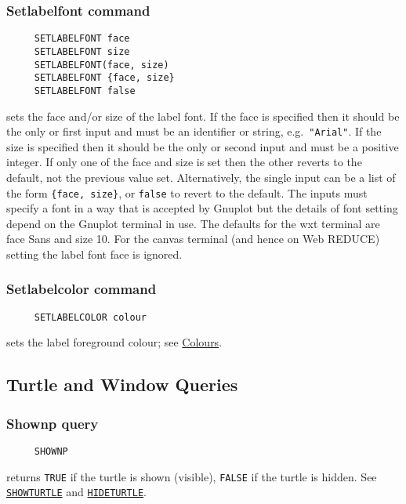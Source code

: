 \hypertarget{logoturtle:setlabelfont}{\subsubsection*{Setlabelfont command}}
\begin{verbatim}
     SETLABELFONT face
     SETLABELFONT size
     SETLABELFONT(face, size)
     SETLABELFONT {face, size}
     SETLABELFONT false
\end{verbatim}
sets the face and/or size of the label font.  If the face is specified
then it should be the only or first input and must be an identifier or
string, e.g.\ \texttt{"Arial"}.  If the size is specified then it
should be the only or second input and must be a positive integer.  If
only one of the face and size is set then the other reverts to the
default, not the previous value set.  Alternatively, the single input
can be a list of the form \texttt{\{face, size\}}, or \texttt{false}
to revert to the default.  The inputs must specify a font in a way
that is accepted by Gnuplot but the details of font setting depend on
the Gnuplot terminal in use.  The defaults for the wxt terminal are
face Sans and size 10.  For the canvas terminal (and hence on Web
REDUCE) setting the label font face is ignored.

\subsubsection*{Setlabelcolor command}
\begin{verbatim}
     SETLABELCOLOR colour
\end{verbatim}
sets the label foreground colour; see
\hyperref[logoturtle:Colours]{Colours}.


\subsection{Turtle and Window Queries}

\subsubsection*{Shownp query}
\begin{verbatim}
     SHOWNP
\end{verbatim}
returns \texttt{TRUE} if the turtle is shown (visible), \texttt{FALSE}
if the turtle is hidden.  See
\hyperlink{logoturtle:showturtle}{\texttt{SHOWTURTLE}} and
\hyperlink{logoturtle:hideturtle}{\texttt{HIDETURTLE}}.

